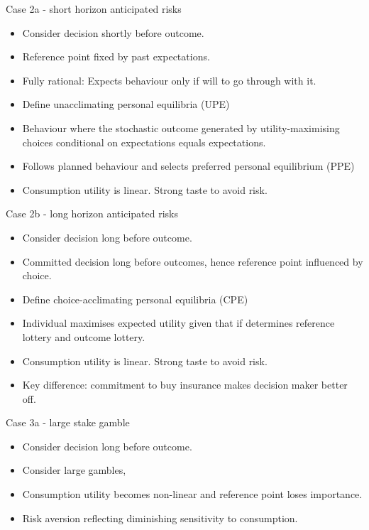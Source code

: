 \documentclass[11pt, aspectratio=169]{beamer}
\begin{document}
 \begin{frame}{Case 2a - short horizon anticipated risks}
    \begin{itemize}
    \item Consider decision shortly before outcome.\medskip
    \item Reference point fixed by past expectations.\medskip
    \item  Fully rational: Expects behaviour only if will to go through with it.\medskip
            \item Define unacclimating personal equilibria (UPE)\medskip
            \item Behaviour where the stochastic outcome generated by utility-maximising choices conditional on expectations equals expectations.\medskip
            \item Follows planned behaviour and selects preferred personal equilibrium (PPE)\medskip
           \item Consumption utility is linear. Strong taste to avoid risk.\medskip
            \end{itemize}
            \end{frame}


     \begin{frame}{Case 2b - long horizon anticipated risks}
    \begin{itemize}
    \item Consider decision long before outcome.\medskip
       \item Committed decision long before outcomes, hence reference point influenced by choice.\medskip
            \item Define choice-acclimating personal equilibria (CPE)\medskip
            \item Individual maximises expected utility given that if determines reference lottery and outcome lottery.\medskip
           \item Consumption utility is linear. Strong taste to avoid risk.\medskip
           \item Key difference: commitment to buy insurance makes decision maker better off.\medskip
    \end{itemize}
\end{frame}

     \begin{frame}{Case 3a - large stake gamble}
    \begin{itemize}
    \item Consider decision long before outcome.\medskip
     \item Consider large gambles,
     \item Consumption utility becomes non-linear and  reference point loses importance.\medskip
     \item Risk aversion reflecting diminishing sensitivity to consumption.\medskip  \end{itemize}
\end{frame}
\end{document}
